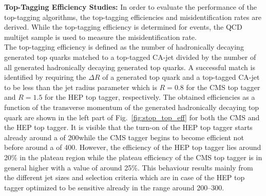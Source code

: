 \begin{description}
\item {\textbf{Top-Tagging Efficiency Studies:}} In order to evaluate the performance of the top-tagging algorithms, the top-tagging efficiencies and misidentification rates are derived. While the top-tagging efficiency is determined for \ttbar events, the QCD multijet sample is used to measure the misidentification rate. \\
The top-tagging efficiency is defined as the number of hadronically decaying generated top quarks matched to a top-tagged CA-jet divided by the number of all generated hadronically decaying generated top quarks. A successful match is identified by requiring the $\Delta R$ of a generated top quark and a top-tagged CA-jet to be less than the jet radius parameter which is $R=0.8$ for the CMS top tagger and $R=1.5$ for the HEP top tagger, respectively. The obtained efficiencies as a function of the transverse momentum of the generated hadronically decaying top quark are shown in the left part of Fig.~\ref{fig:stop_top_eff} for both the CMS and the HEP top tagger. It is visible that the turn-on of the HEP top tagger starts already around a \pt of 200\gev while the CMS tagger begins to become efficient not before around a \pt of 400\gev. However, the efficiency of the HEP top tagger lies around 20\% in the plateau region while the plateau efficiency of the CMS top tagger is in general higher with a value of around 25\%. This behaviour results mainly from the different jet sizes and selection criteria which are in case of the HEP top tagger optimized to be sensitive already in the \pt range around 200--300\gev.
\begin{figure}[!t]
  \centering
{}
\end{figure}
\end{description}
